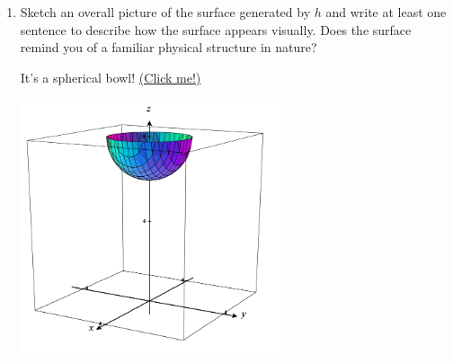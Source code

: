 \documentclass[10pt]{article}
\newenvironment{red}{\color{red}}{\ignorespacesafterend}
\begin{document}
\begin{enumerate}[leftmargin=0pt]
\begin{enumerate}
        \item Sketch an overall picture of the surface generated by $h$ and write at least one sentence to describe how the surface appears visually. Does the surface remind you of a familiar physical structure in nature?
        
        \begin{red}
            It's a spherical bowl! \href{https://c3d.libretexts.org/CalcPlot3D/index.html?type=z;z=8-sqrt(4-x%5E2-y%5E2);funname=f;visible=true;umin=-4;umax=4;vmin=-4;vmax=4;grid=31;format=normal;alpha=-1;hidemyedges=false;constcol=rgb(255,0,0);view=0;contourcolor=red;fixdomain=false;activetrace=false;contourplot=true;showcontourplot=false;firstvalue=-1;stepsize=0.2;numlevels=11;list=;uselist=false;xnum=46;ynum=46;show2d=false;hidesurface=false;hidelabels=true;showprojections=false;surfacecontours=true;projectioncolor=rgba(255,0,0,1);showxygrid=false;showxygridonbox=false;showconstraint=false&type=window;showfunnot=false;hsrmode=0;nomidpts=true;anaglyph=-1;center=8.236391035463319,4.755282581475766,3.0901699437494745,1;focus=0,0,0,1;up=0,0,2,1;transparent=false;alpha=140;twoviews=false;unlinkviews=false;axisextension=0.7;shownormals=false;shownormalsatpts=false;xaxislabel=x;yaxislabel=y;zaxislabel=z;edgeson=true;faceson=true;showbox=true;showaxes=true;showticks=true;perspective=true;centerxpercent=0.5;centerypercent=0.7500000000000002;rotationsteps=30;autospin=true;xygrid=false;yzgrid=false;xzgrid=false;gridsonbox=true;gridplanes=false;gridcolor=rgb(128,128,128);lastaddedsurfaceactive=true;disabletrace=false;activefun=-1;xmin=-4;xmax=4;ymin=-4;ymax=4;zmin=0;zmax=8;xscale=4;yscale=4;zscale=4;zcmin=-16;zcmax=16;xscalefactor=1;yscalefactor=1;zscalefactor=1;tracemode=0;keep2d=false;zoom=0.576471}{(Click me!)}

            \begin{center}
                \includegraphics[width=0.6\textwidth]{../images/9-1-17-bowl.png}
            \end{center}
        \end{red}
    \end{enumerate}
\end{enumerate}
\end{document}
